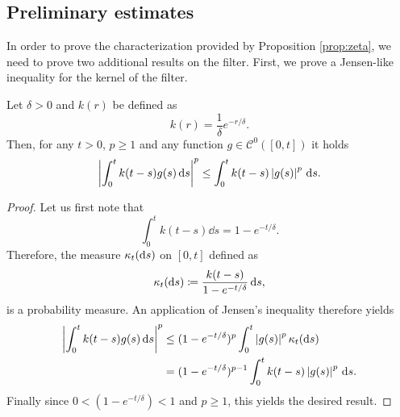 \documentclass[10pt]{article}
\begin{document}
\begin{appendices}
\subsection{Preliminary estimates}
In order to prove the characterization provided by Proposition \ref{prop:zeta}, we need to prove two additional results on the filter. First, we prove a Jensen-like inequality for the kernel of the filter.

\begin{lemma}\label{lem:FilterJensen} Let $\delta > 0$ and $k(r)$ be defined as
	\begin{equation}
		k(r) = \frac1\delta e^{-r/\delta}.
	\end{equation}
	Then, for any $t > 0$, $p \geq 1$ and any function $g\in \mathcal C^0([0, t])$ it holds 
		\begin{equation}
			\left\lvert\int_0^t k(t-s) g(s) \,\mathrm{d} s\right\rvert^p \leq \int_0^t k(t-s) \left\lvert g(s)\right\rvert^p \,\mathrm{d} s.
		\end{equation}
\end{lemma}
\begin{proof} Let us first note that
	\begin{equation}
		\int_0^t k(t-s) \dd s = 1 - e^{-t/\delta}.
	\end{equation}
	Therefore, the measure $\kappa_t(\mathrm{d} s)$ on $[0, t]$ defined as
	\begin{equation}
		\kappa_t(\mathrm{d} s) \coloneqq \frac{k(t-s)}{1 - e^{-t/\delta}} \,\mathrm{d} s,
	\end{equation}
	is a probability measure. An application of Jensen's inequality therefore yields
	\begin{equation}
	\begin{aligned}
		\left\lvert\int_0^t k(t-s) g(s) \,\mathrm{d} s\right\rvert^p &\leq (1 - e^{-t/\delta})^p \int_0^t \left\lvert g(s)\right\rvert^p \kappa_t(\mathrm{d} s) \\
		&= (1 - e^{-t/\delta})^{p-1} \int_0^t k(t-s) \left\lvert g(s)\right\rvert^p \,\mathrm{d} s.
	\end{aligned}
	\end{equation}
	Finally since $0 < (1 - e^{-t/\delta})< 1$ and $p \geq 1$, this yields the desired result.
\end{proof}


\end{appendices}
\end{document}
